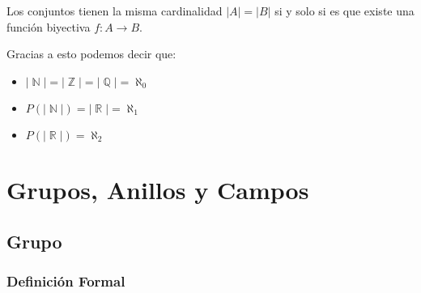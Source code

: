 \documentclass[12pt]{report}                                    %
\DeclareMathOperator \Naturals  {\mathbb{N}}                     %
\DeclareMathOperator \Integers  {\mathbb{Z}}                     %
\DeclareMathOperator \Racionals {\mathbb{Q}}                     %
\DeclareMathOperator \Reals     {\mathbb{R}}                     %
\begin{document}
            Los conjuntos tienen la misma cardinalidad $|A| = |B|$ si y solo si es que existe
            una función biyectiva $f : A \to B$.


            Gracias a esto podemos decir que:

            \begin{itemize} 
                \item $|\Naturals| = |\Integers| = |\Racionals| = \aleph_0$

                \item $P(|\Naturals|) = |\Reals| = \aleph_1$

                \item $P(|\Reals|) = \aleph_2$

            \end{itemize} 





    \chapter{Grupos, Anillos y Campos}
        \clearpage


        \clearpage
        \section{Grupo}

            \subsection{Definición Formal}
\end{document}
